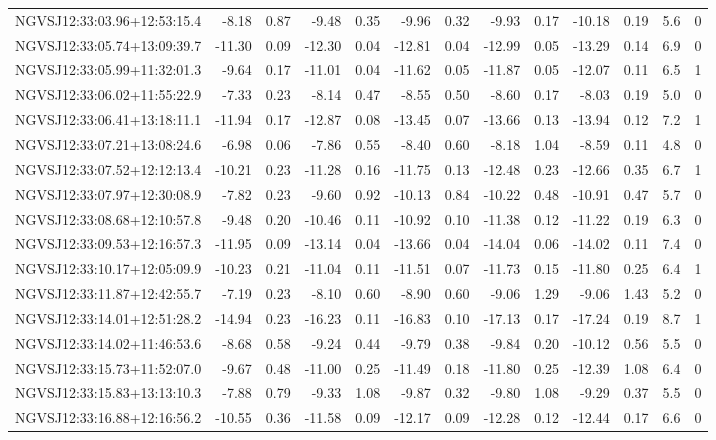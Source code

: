 \begin{tabular}{lrrrrrrrrrrcc}
NGVSJ12:33:03.96+12:53:15.4 & -8.18 & 0.87 & -9.48 & 0.35 & -9.96 & 0.32 & -9.93 & 0.17 & -10.18 & 0.19 & 5.6 & 0 \\
NGVSJ12:33:05.74+13:09:39.7 & -11.30 & 0.09 & -12.30 & 0.04 & -12.81 & 0.04 & -12.99 & 0.05 & -13.29 & 0.14 & 6.9 & 0 \\
NGVSJ12:33:05.99+11:32:01.3 & -9.64 & 0.17 & -11.01 & 0.04 & -11.62 & 0.05 & -11.87 & 0.05 & -12.07 & 0.11 & 6.5 & 1 \\
NGVSJ12:33:06.02+11:55:22.9 & -7.33 & 0.23 & -8.14 & 0.47 & -8.55 & 0.50 & -8.60 & 0.17 & -8.03 & 0.19 & 5.0 & 0 \\
NGVSJ12:33:06.41+13:18:11.1 & -11.94 & 0.17 & -12.87 & 0.08 & -13.45 & 0.07 & -13.66 & 0.13 & -13.94 & 0.12 & 7.2 & 1 \\
NGVSJ12:33:07.21+13:08:24.6 & -6.98 & 0.06 & -7.86 & 0.55 & -8.40 & 0.60 & -8.18 & 1.04 & -8.59 & 0.11 & 4.8 & 0 \\
NGVSJ12:33:07.52+12:12:13.4 & -10.21 & 0.23 & -11.28 & 0.16 & -11.75 & 0.13 & -12.48 & 0.23 & -12.66 & 0.35 & 6.7 & 1 \\
NGVSJ12:33:07.97+12:30:08.9 & -7.82 & 0.23 & -9.60 & 0.92 & -10.13 & 0.84 & -10.22 & 0.48 & -10.91 & 0.47 & 5.7 & 0 \\
NGVSJ12:33:08.68+12:10:57.8 & -9.48 & 0.20 & -10.46 & 0.11 & -10.92 & 0.10 & -11.38 & 0.12 & -11.22 & 0.19 & 6.3 & 0 \\
NGVSJ12:33:09.53+12:16:57.3 & -11.95 & 0.09 & -13.14 & 0.04 & -13.66 & 0.04 & -14.04 & 0.06 & -14.02 & 0.11 & 7.4 & 0 \\
NGVSJ12:33:10.17+12:05:09.9 & -10.23 & 0.21 & -11.04 & 0.11 & -11.51 & 0.07 & -11.73 & 0.15 & -11.80 & 0.25 & 6.4 & 1 \\
NGVSJ12:33:11.87+12:42:55.7 & -7.19 & 0.23 & -8.10 & 0.60 & -8.90 & 0.60 & -9.06 & 1.29 & -9.06 & 1.43 & 5.2 & 0 \\
NGVSJ12:33:14.01+12:51:28.2 & -14.94 & 0.23 & -16.23 & 0.11 & -16.83 & 0.10 & -17.13 & 0.17 & -17.24 & 0.19 & 8.7 & 1 \\
NGVSJ12:33:14.02+11:46:53.6 & -8.68 & 0.58 & -9.24 & 0.44 & -9.79 & 0.38 & -9.84 & 0.20 & -10.12 & 0.56 & 5.5 & 0 \\
NGVSJ12:33:15.73+11:52:07.0 & -9.67 & 0.48 & -11.00 & 0.25 & -11.49 & 0.18 & -11.80 & 0.25 & -12.39 & 1.08 & 6.4 & 0 \\
NGVSJ12:33:15.83+13:13:10.3 & -7.88 & 0.79 & -9.33 & 1.08 & -9.87 & 0.32 & -9.80 & 1.08 & -9.29 & 0.37 & 5.5 & 0 \\
NGVSJ12:33:16.88+12:16:56.2 & -10.55 & 0.36 & -11.58 & 0.09 & -12.17 & 0.09 & -12.28 & 0.12 & -12.44 & 0.17 & 6.6 & 0 \\

\end{tabular}
